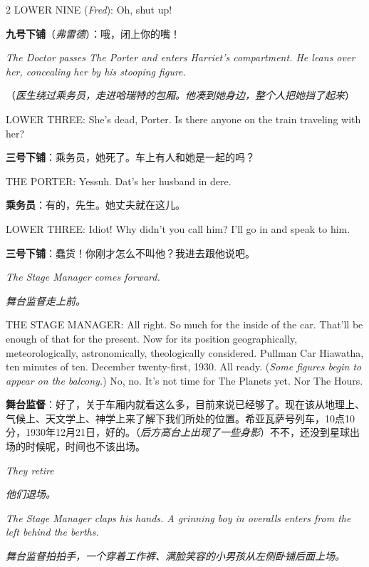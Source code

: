 \documentclass[lang=cn,newtx,10pt,scheme=chinese]{elegantbook}
\newcommand{\pair}[2]{%
\switchcolumn* #2\par
\switchcolumn  #1\par
}
\begin{document}
\begin{paracol}{2}
\pair{
    \textbf{九号下铺}（\textit{弗雷德}）：哦，闭上你的嘴！
}{
    LOWER NINE (\textit{Fred}): Oh, shut up!
    \newline
    \newline
}

\pair{
    （\textit{医生绕过乘务员，走进哈瑞特的包厢。他凑到她身边，整个人把她挡了起来}）
}{
    \textit{The Doctor passes The Porter and enters Harriet's compartment. He leans over her, concealing her by his stooping figure.}
    \newline
    \newline
}

\pair{
    \textbf{三号下铺}：乘务员，她死了。车上有人和她是一起的吗？
}{
    LOWER THREE: She's dead, Porter. Is there anyone on the train traveling with her?
}

\pair{
    \textbf{乘务员}：有的，先生。她丈夫就在这儿。
}{
    THE PORTER: Yessuh. Dat's her husband in dere.
}

\pair{
    \textbf{三号下铺}：蠢货！你刚才怎么不叫他？我进去跟他说吧。
}{
    LOWER THREE: Idiot! Why didn't you call him? I'll go in and speak to him.
    \newline
}

\pair{
    \textit{舞台监督走上前。}
}{
    \textit{The Stage Manager comes forward.}
    \newline
}

\pair{
    \textbf{舞台监督}：好了，关于车厢内就看这么多，目前来说已经够了。现在该从地理上、气候上、天文学上、神学上来了解下我们所处的位置。希亚瓦萨号列车，10点10分，1930年12月21日，好的。（\textit{后方高台上出现了一些身影}）不不，还没到星球出场的时候呢，时间也不该出场。
}{
    THE STAGE MANAGER: All right. So much for the inside of the car. That'll be enough of that for the present. Now for its position geographically, meteorologically, astronomically, theologically considered. Pullman Car Hiawatha, ten minutes of ten. December twenty-first, 1930. All ready. (\textit{Some figures begin to appear on the balcony.}) No, no. It's not time for The Planets yet. Nor The Hours.
    \newline
}

\pair{
    \textit{他们退场。}
}{
    \textit{They retire}
    \newline
}

\pair{
    \textit{舞台监督拍拍手，一个穿着工作裤、满脸笑容的小男孩从左侧卧铺后面上场。}
}{
    \textit{The Stage Manager claps his hands. A grinning boy in overalls enters from the left behind the berths.}
    \newline
}


\end{paracol}
\end{document}
